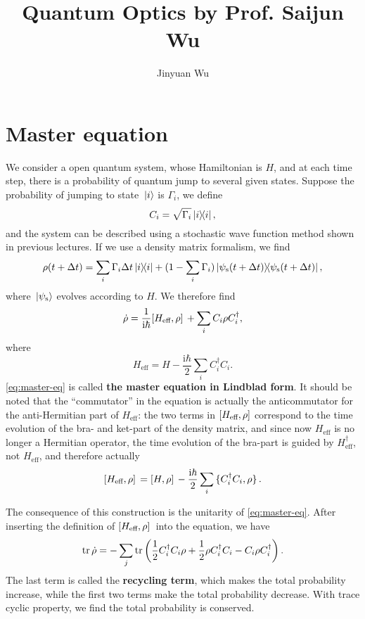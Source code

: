 \documentclass[hyperref, a4paper]{article}
\title{Quantum Optics by Prof. Saijun Wu}
\author{Jinyuan Wu}
\newcommand*{\ii}{\mathrm{i}}
\newcommand*{\concept}[1]{{\textbf{#1}}}
\begin{document}
\maketitle

\section{Master equation}

We consider a open quantum system, whose Hamiltonian is $H$, and at each time step, there is a probability 
of quantum jump to several given states. Suppose the probability of jumping to state $\ket*{i}$ is $\Gamma_i$,
we define 
\begin{equation}
    C_i = \sqrt{\Gamma_i} \dyad{i},
\end{equation} 
and the system can be described using a stochastic wave function method shown in previous lectures.
If we use a density matrix formalism, we find 
\[
    \rho(t + \Delta t) = \sum_i \Gamma_i \Delta t \dyad{i} + (1 - \sum_i \Gamma_i) \dyad{\psi_\text{s}(t + \Delta t)},
\]
where $\ket*{\psi_\text{s}}$ evolves according to $H$. We therefore find 
\begin{equation}
    \dot{\rho} = \frac{1}{\ii \hbar} \comm*{H_\text{eff}}{\rho} + \sum_i C_i \rho C_i^\dagger,
    \label{eq:master-eq}
\end{equation}
where 
\begin{equation}
    H_\text{eff} = H - \frac{\ii \hbar}{2} \sum_i C_i^\dagger C_i.
\end{equation}
\eqref{eq:master-eq} is called \concept{the master equation in Lindblad form}.
It should be noted that the ``commutator'' in the equation 
is actually the anticommutator for the  anti-Hermitian part of $H_{\text{eff}}$:
the two terms in $\comm{H_{\text{eff}}}{\rho}$ 
correspond to the time evolution of the bra- and ket-part of the density matrix,
and since now $H_{\text{eff}}$ is no longer a Hermitian operator,
the time evolution of the bra-part is guided by $H_{\text{eff}}^\dagger$, 
not $H_{\text{eff}}$,
and therefore actually 
\[
    \comm*{H_{\text{eff}}}{\rho} = 
    \comm*{H}{\rho} - \frac{\ii \hbar}{2}
    \sum_i \acomm*{C_i^\dagger C_i}{\rho}.
\]

The consequence of this construction is the unitarity of \eqref{eq:master-eq}. 
After inserting the definition of $\comm*{H_{\text{eff}}}{\rho}$ into the equation, we have 
\begin{equation}
    \trace \dot{\rho} = - \sum_j \trace \left( \frac{1}{2} C_i^\dagger C_i \rho + \frac{1}{2} \rho C_i^\dagger C_i - C_i \rho C_i^\dagger \right).
\end{equation}
The last term is called the \concept{recycling term}, which makes the total probability increase, while the first 
two terms make the total probability decrease. With trace cyclic property, we find the total probability 
is conserved.
\end{document}
